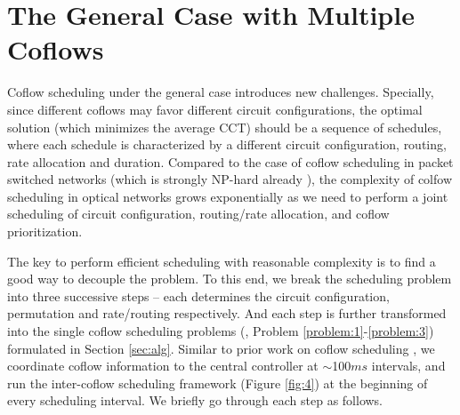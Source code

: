 \section{The General Case with Multiple Coflows}
\label{sec:alg4}


Coflow scheduling under the general case introduces new challenges.
Specially, since different coflows may favor different circuit configurations, the optimal solution (which minimizes the average CCT) should be a sequence of schedules, where each schedule is characterized by a different circuit configuration, routing, rate allocation and duration.
Compared to the case of coflow scheduling in packet switched networks (which is strongly NP-hard already \cite{varys}), the complexity of colfow scheduling in optical networks grows exponentially as we need to perform a joint scheduling of circuit configuration, routing/rate allocation, and coflow prioritization.


The key to perform efficient scheduling with reasonable complexity is to find a good way to decouple the problem. To this end,
we break the scheduling problem into three successive steps -- each determines the circuit configuration, permutation and rate/routing respectively.
And each step is further transformed into the single coflow scheduling problems (\ie, Problem \ref{problem:1}-\ref{problem:3}) formulated in Section \ref{sec:alg}. Similar to prior work on coflow scheduling \cite{varys,aalo,coda}, we coordinate coflow information to the central controller at $\sim$100$ms$ intervals, and run the inter-coflow scheduling framework (Figure \ref{fig:4}) at the beginning of every scheduling interval.  We briefly go through each step as follows.



